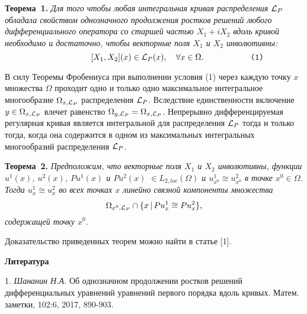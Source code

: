 \textbf{Теорема~1.} {\it Для того чтобы любая интегральная кривая распределения ${\cal L}_P$  обладала свойством однозначного продолжения ростков решений любого дифференциального оператора со старшей частью $X_1+iX_2$ вдоль кривой  необходимо и достаточно, чтобы векторные поля $X_1$ и $X_2$ инволютивны: $$\hspace{2cm} [X_1, X_2](x)\in  {\cal L}_P(x),\quad \forall x\in \Omega.\hspace{2cm}\verb"(1)"$$
}


В силу Теоремы Фробениуса при выполнении условия (1)  через каждую точку $x$ множества $\Omega$ проходит одно и только одно максимальное интегральное многообразие $\Omega_{x, {\cal L}_P}$ распределения ${\cal L}_P$. Вследствие единственности
 включение $y\in \Omega_{x, {\cal L}_P}$ влечет равенство $\Omega_{y, {\cal L}_P}=\Omega_{x, {\cal L}_P}$. Непрерывно дифференцируемая
регулярная кривая является интегральной для распределения ${\cal L}_P$ тогда и только тогда, когда она содержится в одном из максимальных интегральных многообразий распределения ${\cal L}_P$.










\textbf{Теорема~2.} {\it Предположим, что векторные поля $X_1$ и $X_2$ инволютивны,
функции $u^1(x)$, $u^2(x)$, $Pu^1(x)$ и $Pu^2(x)$ $\in L_{2, loc}(\Omega)$ и    $u^1_{x^0}\cong u^2_{x^0}$ в  точке $x^0\in\Omega$.
Тогда $u^1_{x}\cong u^2_{x}$ во всех точках $x$ линейно связной компоненты множества
$$
\Omega_{x^0, {\cal L}_P}\cap\{x \,|\, Pu^1_{x}\cong Pu^2_x\},
$$
содержащей точку $x^0$.}

Доказательство приведенных теорем можно найти в статье  [1].



\smallskip \centerline{\bf Литература}\nopagebreak

1. {\it Шананин Н.А.} Об однозначном продолжении ростков  решений
дифференциальных уравнений уравнений  первого порядка  вдоль кривых. Матем. заметки, 102:6, 2017, 890-903.

